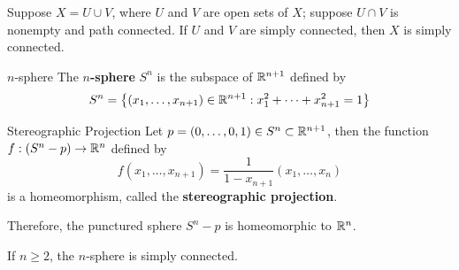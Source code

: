 \documentclass[12pt,a4paper]{article}
\begin{document}
    \begin{cor}
        Suppose $X=U\cup V$, where $U$ and $V$ are open sets of $X$; suppose $U\cap V$ is nonempty and path connected. If $U$ and $V$ are simply connected, then $X$ is simply connected.
    \end{cor}
    \bigskip

    \begin{defi}{$n$-sphere}
        The \textbf{$n$-sphere} $S^n$ is the subspace of $\mathbb{R}^{n+1}$ defined by
        \[
            S^n=\left\{ (x_1,\dots,x_{n+1})\in\mathbb{R}^{n+1}:x_1^2+\cdots+x_{n+1}^2=1 \right\}
        \]
    \end{defi}

    \begin{defi}{Stereographic Projection}
        Let $p=(0,\dots,0,1)\in S^n\subset\mathbb{R}^{n+1}$, then the function $f:(S^n-p)\to\mathbb{R}^n$ defined by
        \[
            f(x_1,\dots,x_{n+1})=\frac{1}{1-x_{n+1}}(x_1,\dots,x_n)
        \]
        is a homeomorphism, called the \textbf{stereographic projection}.

        Therefore, the punctured sphere $S^n-p$ is homeomorphic to $\mathbb{R}^n$.
    \end{defi}
    \bigskip
    
    \begin{thm}
        If $n\geq 2$, the $n$-sphere is simply connected.
    \end{thm}
    \bigskip
\end{document}
